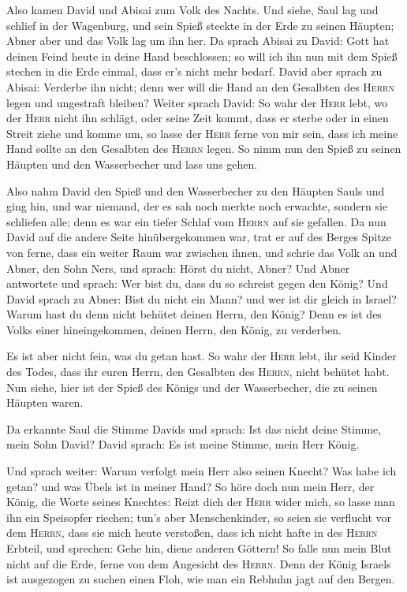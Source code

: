  Also kamen David und Abisai zum Volk des Nachts. Und
siehe, Saul lag und schlief in der Wagenburg, und sein Spieß steckte in
der Erde zu seinen Häupten; Abner aber und das Volk lag um ihn her.
 Da sprach Abisai zu David: Gott hat deinen Feind heute in
deine Hand beschlossen; so will ich ihn nun mit dem Spieß stechen in die
Erde einmal, dass er's nicht mehr bedarf.  David aber
sprach zu Abisai: Verderbe ihn nicht; denn wer will die Hand an den
Gesalbten des \textsc{Herrn} legen und ungestraft bleiben?
 Weiter sprach David: So wahr der \textsc{Herr} lebt, wo
der \textsc{Herr} nicht ihn schlägt, oder seine Zeit kommt, dass er
sterbe oder in einen Streit ziehe und komme um,  so lasse
der \textsc{Herr} ferne von mir sein, dass ich meine Hand sollte an den
Gesalbten des \textsc{Herrn} legen. So nimm nun den Spieß zu seinen
Häupten und den Wasserbecher und lass uns gehen.

 Also nahm David den Spieß und den Wasserbecher zu den
Häupten Sauls und ging hin, und war niemand, der es sah noch merkte noch
erwachte, sondern sie schliefen alle; denn es war ein tiefer Schlaf vom
\textsc{Herrn} auf sie gefallen.  Da nun David auf die
andere Seite hinübergekommen war, trat er auf des Berges Spitze von
ferne, dass ein weiter Raum war zwischen ihnen,  und
schrie das Volk an und Abner, den Sohn Ners, und sprach: Hörst du nicht,
Abner? Und Abner antwortete und sprach: Wer bist du, dass du so schreist
gegen den König?  Und David sprach zu Abner: Bist du
nicht ein Mann? und wer ist dir gleich in Israel? Warum hast du denn
nicht behütet deinen Herrn, den König? Denn es ist des Volks einer
hineingekommen, deinen Herrn, den König, zu verderben.

 Es ist aber nicht fein, was du getan hast. So wahr der
\textsc{Herr} lebt, ihr seid Kinder des Todes, dass ihr euren Herrn, den
Gesalbten des \textsc{Herrn}, nicht behütet habt. Nun siehe, hier ist
der Spieß des Königs und der Wasserbecher, die zu seinen Häupten waren.

 Da erkannte Saul die Stimme Davids und sprach: Ist das
nicht deine Stimme, mein Sohn David? David sprach: Es ist meine Stimme,
mein Herr König.

 Und sprach weiter: Warum verfolgt mein Herr also seinen
Knecht? Was habe ich getan? und was Übels ist in meiner Hand?
 So höre doch nun mein Herr, der König, die Worte seines
Knechtes: Reizt dich der \textsc{Herr} wider mich, so lasse man ihn ein
Speisopfer riechen; tun's aber Menschenkinder, so seien sie verflucht
vor dem \textsc{Herrn}, dass sie mich heute verstoßen, dass ich nicht
hafte in des \textsc{Herrn} Erbteil, und sprechen: Gehe hin, diene
anderen Göttern!  So falle nun mein Blut nicht auf die
Erde, ferne von dem Angesicht des \textsc{Herrn}. Denn der König Israels
ist ausgezogen zu suchen einen Floh, wie man ein Rebhuhn jagt auf den
Bergen.

